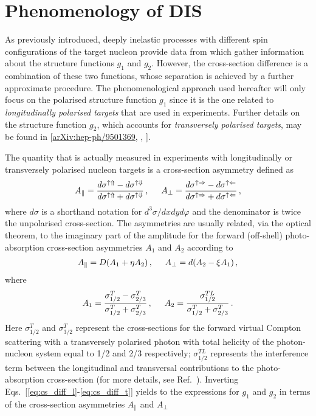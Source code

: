 \section{Phenomenology of DIS}
As previously introduced, deeply inelastic processes with different spin configurations of the target nucleon provide data from which gather information about the structure functions $g_1$ and $g_2$. However, the cross-section difference is a combination of these two functions, whose separation is achieved by a further approximate procedure. The phenomenological approach used hereafter will only focus on the polarised structure function $g_1$ since it is the one related to \textit{longitudinally polarised targets} that are used in experiments. Further details on the structure function $g_2$, which accounts for \textit{transversely polarised targets}, may be found in [\href{https://arxiv.org/abs/hep-ph/9501369}{arXiv:hep-ph/9501369}, \cite{leader_2001}, \cite{leader_predazzi_1996}].\par
The quantity that is actually measured in experiments with longitudinally or transversely polarised nucleon targets is a cross-section asymmetry defined as
\begin{equation}
  A_{\parallel} = \frac{d\sigma^{\uparrow \Uparrow} - d\sigma^{\uparrow \Downarrow}}{d\sigma^{\uparrow \Uparrow} + d\sigma^{\uparrow \Downarrow}} \,, \hspace{5mm}  A_{\perp} = \frac{d\sigma^{\uparrow \Rightarrow} - d\sigma^{\uparrow \Leftarrow}}{d\sigma^{\uparrow \Rightarrow} + d\sigma^{\uparrow \Leftarrow}} \,,
  \label{eq:asymmetry}
\end{equation}
where $d\sigma$ is a shorthand notation for $d^3\sigma/dxdyd\varphi$ and the denominator is twice the unpolarised cross-section. The asymmetries are usually related, via the optical theorem, to the imaginary part of the amplitude for the forward (off-shell) photo-absorption cross-section asymmetries $A_1$ and $A_2$ according to
\begin{align}
  A_{\parallel} = D(A_1 + \eta A_2)\,, \hspace{5mm} A_{\perp} = d(A_2 - \xi A_1)\,,
\end{align}
where 
\begin{equation}
  A_1 = \frac{\sigma_{1/2}^T - \sigma_{2/3}^T}{\sigma_{1/2}^T + \sigma_{2/3}^T} \,, \hspace{5mm} A_2 = \frac{\sigma_{1/2}^{TL}}{\sigma_{1/2}^T + \sigma_{2/3}^T}\,.
\end{equation}
Here $\sigma_{1/2}^T$ and $\sigma_{3/2}^T$ represent the cross-sections for the forward virtual Compton scattering with a transversely polarised photon with total helicity of the photon-nucleon system equal to 1/2 and 2/3 respectively; $\sigma_{1/2}^{TL}$ represents the interference term between the longitudinal and transversal contributions to the photo-absorption cross-section (for more details, see Ref.~\cite{leader_predazzi_1996}). Inverting Eqs.~[\ref{eq:cs_diff_l}-\ref{eq:cs_diff_t}] yields to the expressions for $g_1$ and $g_2$ in terms of the cross-section asymmetries $A_{\parallel}$ and $A_{\perp}$
